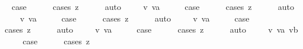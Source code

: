 \begin{isabellebody}
\ \isamarkupfalse%
\ {\isacharquery}case\isanewline
\ \ \ \ \isamarkupfalse%
\ {\isacharparenleft}cases\ z{\isacharparenright}\isanewline
\ \ \ \ \isamarkupfalse%
\ auto\isanewline
{}\isamarkupfalse%
\isanewline
\ \ \isamarkupfalse%
\ {\isacharparenleft}{\isachardoublequoteopen}{}{}{\isacharunderscore}{}{\isachardoublequoteclose}\ v\ va{\isacharparenright}\isanewline
\ \ \isamarkupfalse%
\ \isamarkupfalse%
\ {\isacharquery}case\isanewline
\ \ \ \ \isamarkupfalse%
\ {\isacharparenleft}cases\ z{\isacharparenright}\isanewline
\ \ \ \ \isamarkupfalse%
\ auto\isanewline
{}\isamarkupfalse%
\isanewline
\ \ \isamarkupfalse%
\ {\isacharparenleft}{\isachardoublequoteopen}{}{}{\isacharunderscore}{}{\isachardoublequoteclose}\ v\ va{\isacharparenright}\isanewline
\ \ \isamarkupfalse%
\ \isamarkupfalse%
\ {\isacharquery}case\isanewline
\ \ \ \ \isamarkupfalse%
\ {\isacharparenleft}cases\ z{\isacharparenright}\isanewline
\ \ \ \ \isamarkupfalse%
\ auto\isanewline
{}\isamarkupfalse%
\isanewline
\ \ \isamarkupfalse%
\ {\isacharparenleft}{\isachardoublequoteopen}{}{}{\isacharunderscore}{}{\isachardoublequoteclose}\ v\ va{\isacharparenright}\isanewline
\ \ \isamarkupfalse%
\ \isamarkupfalse%
\ {\isacharquery}case\isanewline
\ \ \ \ \isamarkupfalse%
\ {\isacharparenleft}cases\ z{\isacharparenright}\isanewline
\ \ \ \ \isamarkupfalse%
\ auto\isanewline
{}\isamarkupfalse%
\isanewline
\ \ \isamarkupfalse%
\ {\isacharparenleft}{}{}\ v\ va{\isacharparenright}\isanewline
\ \ \isamarkupfalse%
\ \isamarkupfalse%
\ {\isacharquery}case\isanewline
\ \ \ \ \isamarkupfalse%
\ {\isacharparenleft}cases\ z{\isacharparenright}\isanewline
\ \ \ \ \isamarkupfalse%
\ auto\isanewline
{}\isamarkupfalse%
\isanewline
\ \ \isamarkupfalse%
\ {\isacharparenleft}{}{}\ v\ va\ vb{\isacharparenright}\isanewline
\ \ \isamarkupfalse%
\ \isamarkupfalse%
\ {\isacharquery}case\isanewline
\ \ \ \ \isamarkupfalse%
\ {\isacharparenleft}cases\ z{\isacharparenright}\isanewline

\end{isabellebody}
